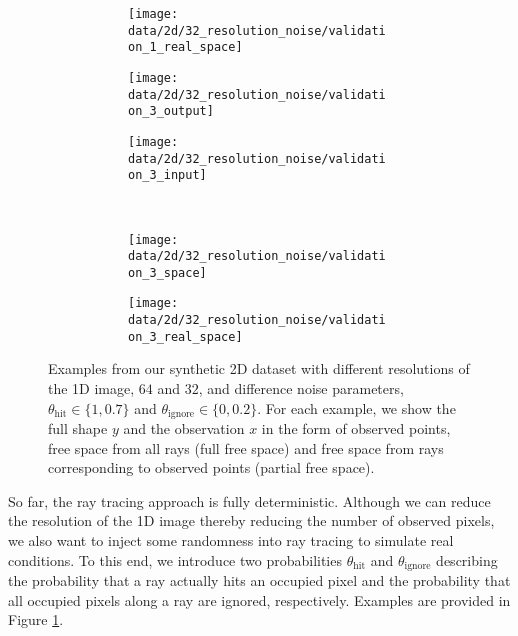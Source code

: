 \begin{figure}
\begin{subfigure}[t]{0.25\textwidth}
    \begin{subfigure}[t]{0.49\textwidth}
      \texttt{[image: data/2d/32\_resolution\_noise/validation\_1\_real\_space]}
    \end{subfigure}
  \end{subfigure}
  \begin{subfigure}[t]{0.25\textwidth}
    \begin{subfigure}[t]{0.49\textwidth}
      \texttt{[image: data/2d/32\_resolution\_noise/validation\_3\_output]}
    \end{subfigure}\hfill
    \begin{subfigure}[t]{0.49\textwidth}
      \texttt{[image: data/2d/32\_resolution\_noise/validation\_3\_input]}
    \end{subfigure}\\[-2px]
    \begin{subfigure}[t]{0.49\textwidth}
      \texttt{[image: data/2d/32\_resolution\_noise/validation\_3\_space]}
    \end{subfigure}\hfill
    \begin{subfigure}[t]{0.49\textwidth}
      \texttt{[image: data/2d/32\_resolution\_noise/validation\_3\_real\_space]}
    \end{subfigure}
  \end{subfigure}
  \caption{Examples from our synthetic 2D dataset with different resolutions of
  the 1D image, \ie $64$ and $32$, and difference noise parameters, \ie
  $\theta_{\text{hit}} \in \{1, 0.7\}$ and $\theta_{\text{ignore}} \in \{0, 0.2\}$.
  For each example, we show the full shape $y$ and the observation $x$
  in the form of observed points, free space from all rays (\ie full free space)
  and free space from rays corresponding to observed points (\ie partial free space).}
  \label{fig:appendix-data-2d-examples-1}
\end{figure}

So far, the ray tracing approach is fully deterministic. Although we can
reduce the resolution of the 1D image thereby reducing the number of observed
pixels, we also want to inject some randomness into ray tracing to
simulate real conditions. To this end, we introduce two probabilities
$\theta_{\text{hit}}$ and $\theta_{\text{ignore}}$ describing the probability
that a ray actually hits an occupied pixel and the probability that
all occupied pixels along a ray are ignored, respectively. Examples are provided
in Figure \ref{fig:appendix-data-2d-examples-1}.

